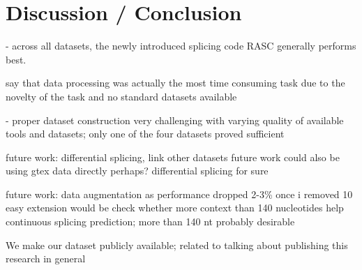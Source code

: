 \chapter{\label{ch:6-conclusion}Discussion / Conclusion}


- across all datasets, the newly introduced splicing code RASC generally performs best.

say that data processing was actually the most time consuming task due to the novelty of the task and no standard datasets available

- proper dataset construction very challenging with varying quality of available tools and datasets; only one of the four datasets proved sufficient


future work: differential splicing, link other datasets
future work could also be using gtex data directly perhaps? 
differential splicing for sure
 
future work: data augmentation as performance dropped 2-3\% once i removed 10%
easy extension would be check whether more context than 140 nucleotides help
continuous splicing prediction; more than 140 nt probably desirable 


We make our dataset publicly available; related to talking about publishing this research in general 